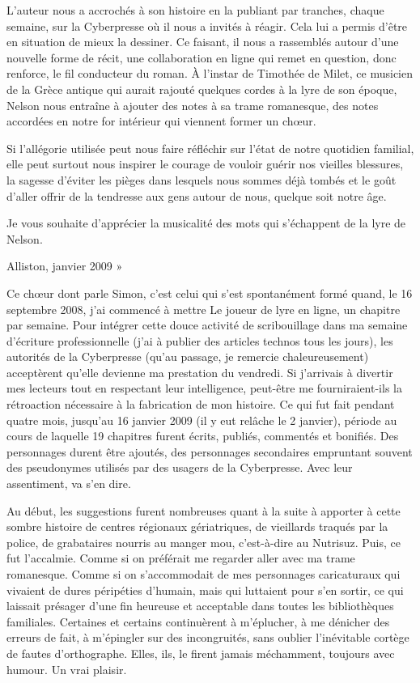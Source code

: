 L’auteur nous a accrochés à son histoire en la publiant par tranches, chaque semaine, sur la Cyberpresse où il nous a invités à réagir. Cela lui a permis d’être en situation de mieux la dessiner. Ce faisant, il nous a rassemblés autour d’une nouvelle forme de récit, une collaboration en ligne qui remet en question, donc renforce, le fil conducteur du roman. À l’instar de Timothée de Milet, ce musicien de la Grèce antique qui aurait rajouté quelques cordes à la lyre de son époque, Nelson nous entraîne à ajouter des notes à sa trame romanesque, des notes accordées en notre for intérieur qui viennent former un chœur.

Si l’allégorie utilisée peut nous faire réfléchir sur l’état de notre quotidien familial, elle peut surtout nous inspirer le courage de vouloir guérir nos vieilles blessures, la sagesse d’éviter les pièges dans lesquels nous sommes déjà tombés et le goût d’aller offrir de la tendresse aux gens autour de nous, quelque soit notre âge.

Je vous souhaite d’apprécier la musicalité des mots qui s’échappent de la lyre de Nelson.

Alliston, janvier 2009 »

Ce chœur dont parle Simon, c’est celui qui s’est spontanément formé quand, le 16 septembre 2008, j’ai commencé à mettre Le joueur de lyre en ligne, un chapitre par semaine. Pour intégrer cette douce activité de scribouillage dans ma semaine d’écriture professionnelle (j’ai à publier des articles technos tous les jours), les autorités de la Cyberpresse (qu’au passage, je remercie chaleureusement) acceptèrent qu’elle devienne ma prestation du vendredi. Si j’arrivais à divertir mes lecteurs tout en respectant leur intelligence, peut-être me fourniraient-ils la rétroaction nécessaire à la fabrication de mon histoire. Ce qui fut fait pendant quatre mois, jusqu’au 16 janvier 2009 (il y eut relâche le 2 janvier), période au cours de laquelle 19 chapitres furent écrits, publiés, commentés et bonifiés. Des personnages durent être ajoutés, des personnages secondaires empruntant souvent des pseudonymes utilisés par des usagers de la Cyberpresse. Avec leur assentiment, va s’en dire.

Au début, les suggestions furent nombreuses quant à la suite à apporter à cette sombre histoire de centres régionaux gériatriques, de vieillards traqués par la police, de grabataires nourris au manger mou, c’est-à-dire au Nutrisuz. Puis, ce fut l’accalmie. Comme si on préférait me regarder aller avec ma trame romanesque. Comme si on s’accommodait de mes personnages caricaturaux qui vivaient de dures péripéties d’humain, mais qui luttaient pour s’en sortir, ce qui laissait présager d’une fin heureuse et acceptable dans toutes les bibliothèques familiales. Certaines et certains continuèrent à m’éplucher, à me dénicher des erreurs de fait, à m’épingler sur des incongruités, sans oublier l’inévitable cortège de fautes d’orthographe. Elles, ils, le firent jamais méchamment, toujours avec humour. Un vrai plaisir.

